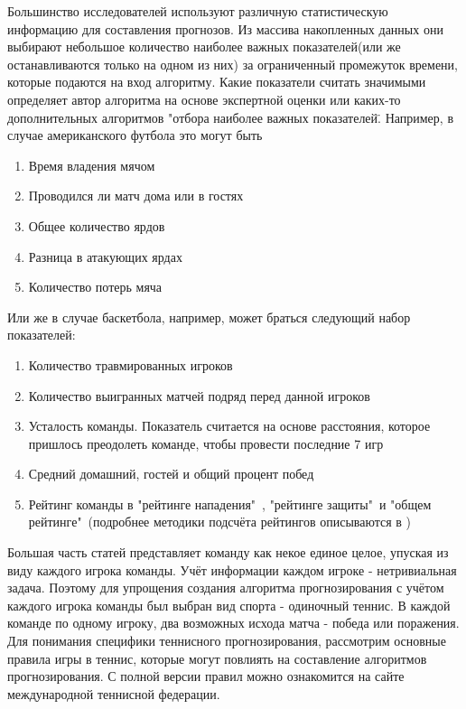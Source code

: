  Большинство исследователей используют различную статистическую информацию для составления прогнозов. Из массива накопленных данных они выбирают небольшое количество наиболее важных показателей(или же останавливаются только на одном из них) за ограниченный промежуток времени, которые подаются на вход алгоритму.
 Какие показатели считать значимыми определяет автор алгоритма на основе экспертной оценки или каких-то дополнительных алгоритмов "отбора наиболее важных показателей\".
 Например, в случае американского футбола\cite{Book02} это могут быть
 \begin{enumerate}
 	\item Время владения мячом
 	\item Проводился ли матч дома или в гостях
 	\item Общее количество ярдов
 	\item Разница в атакующих ярдах
 	\item Количество потерь мяча
 \end{enumerate}
Или же в случае баскетбола, например, может браться следующий набор показателей:
 \begin{enumerate}
	\item  Количество травмированных игроков
	\item Количество выигранных матчей подряд перед данной игроков
	\item Усталость команды. Показатель считается на основе расстояния, которое пришлось преодолеть команде, чтобы провести последние 7 игр
	\item Средний домашний, гостей и общий процент побед
	\item Рейтинг команды в "рейтинге нападения"\ , "рейтинге защиты"\ и "общем рейтинге"\ (подробнее методики подсчёта рейтингов описываются в \cite{Book03})
\end{enumerate}
Большая часть статей представляет команду как некое единое целое, упуская из виду каждого игрока команды. Учёт информации каждом игроке - нетривиальная задача.
Поэтому для упрощения создания алгоритма прогнозирования с учётом каждого игрока команды был выбран вид спорта - одиночный теннис. В каждой команде по одному игроку, два возможных исхода матча - победа или поражения.
Для понимания специфики теннисного прогнозирования, рассмотрим основные правила игры в теннис, которые могут повлиять на составление алгоритмов прогнозирования. С полной версии правил можно ознакомится на сайте международной теннисной федерации\cite{Book04}.
